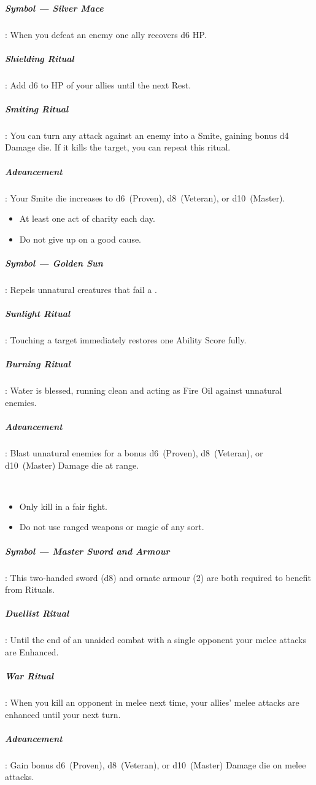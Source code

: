 \documentclass[itdr]{subfiles}
\begin{document}
\subparagraph{Symbol --- Silver Mace}: When you defeat an enemy one ally recovers d6 HP.

\subparagraph{Shielding Ritual}: Add d6 to HP of your allies until the next Rest.

\subparagraph{Smiting Ritual}: You can turn any attack against an enemy into a Smite, gaining bonus d4 Damage die. If it kills the target, you can repeat this ritual.

\subparagraph{Advancement}: Your Smite die increases to d6~(Proven), d8~(Veteran), or d10~(Master).

\vfill
\break

{\em\begin{itemize}
		\item At least one act of charity each day.
		\item Do not give up on a good cause.
\end{itemize}}

\subparagraph{Symbol --- Golden Sun}: Repels unnatural creatures that fail a .

\subparagraph{Sunlight Ritual}: Touching a target immediately restores one Ability Score fully.

\subparagraph{Burning Ritual}: Water is blessed, running clean and acting as Fire Oil against unnatural enemies.

\subparagraph{Advancement}: Blast unnatural enemies for a bonus d6~(Proven), d8~(Veteran), or d10~(Master) Damage die at range.

~

{\em\begin{itemize}
		\item Only kill in a fair fight.
		\item Do not use ranged weapons or magic of any sort.
\end{itemize}}

\subparagraph{Symbol --- Master Sword and Armour}: This two-handed sword (d8) and ornate armour (2) are both required to benefit from Rituals.

\subparagraph{Duellist Ritual}: Until the end of an unaided combat with a single opponent your melee attacks are Enhanced.

\subparagraph{War Ritual}: When you kill an opponent in melee next time, your allies' melee attacks are enhanced until your next turn.

\subparagraph{Advancement}: Gain bonus d6~(Proven), d8~(Veteran), or d10~(Master) Damage die on melee attacks.
\vfill
\break
\end{document}
